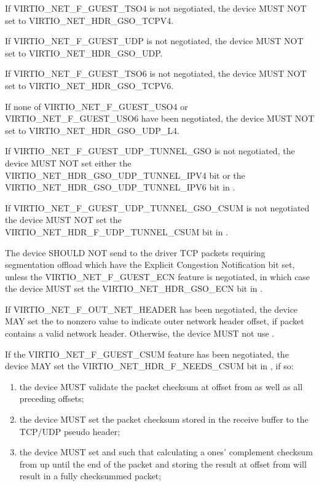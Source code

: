If VIRTIO_NET_F_GUEST_TSO4 is not negotiated, the device MUST NOT set
 to VIRTIO_NET_HDR_GSO_TCPV4.

If VIRTIO_NET_F_GUEST_UDP is not negotiated, the device MUST NOT set
 to VIRTIO_NET_HDR_GSO_UDP.

If VIRTIO_NET_F_GUEST_TSO6 is not negotiated, the device MUST NOT set
 to VIRTIO_NET_HDR_GSO_TCPV6.

If none of VIRTIO_NET_F_GUEST_USO4 or VIRTIO_NET_F_GUEST_USO6 have been negotiated,
the device MUST NOT set  to VIRTIO_NET_HDR_GSO_UDP_L4.

If VIRTIO_NET_F_GUEST_UDP_TUNNEL_GSO is not negotiated, the device MUST NOT set
either the VIRTIO_NET_HDR_GSO_UDP_TUNNEL_IPV4 bit or the
VIRTIO_NET_HDR_GSO_UDP_TUNNEL_IPV6 bit in .

If VIRTIO_NET_F_GUEST_UDP_TUNNEL_GSO_CSUM is not negotiated the device MUST NOT set
the VIRTIO_NET_HDR_F_UDP_TUNNEL_CSUM bit in .

The device SHOULD NOT send to the driver TCP packets requiring segmentation offload
which have the Explicit Congestion Notification bit set, unless the
VIRTIO_NET_F_GUEST_ECN feature is negotiated, in which case the
device MUST set the VIRTIO_NET_HDR_GSO_ECN bit in
.

If VIRTIO_NET_F_OUT_NET_HEADER has been negotiated, the device MAY
set the  to nonzero value to indicate outer network header offset,
if packet contains a valid network header. Otherwise, the device MUST not
use .

If the VIRTIO_NET_F_GUEST_CSUM feature has been negotiated, the
device MAY set the VIRTIO_NET_HDR_F_NEEDS_CSUM bit in
, if so:
\begin{enumerate}
\item the device MUST validate the packet checksum at
	offset  from  as well as all
	preceding offsets;
\item the device MUST set the packet checksum stored in the
	receive buffer to the TCP/UDP pseudo header;
\item the device MUST set  and
	 such that calculating a ones'
	complement checksum from  up until the
	end of the packet and storing the result at offset
	 from   will result in a
	fully checksummed packet;
\end{enumerate}

